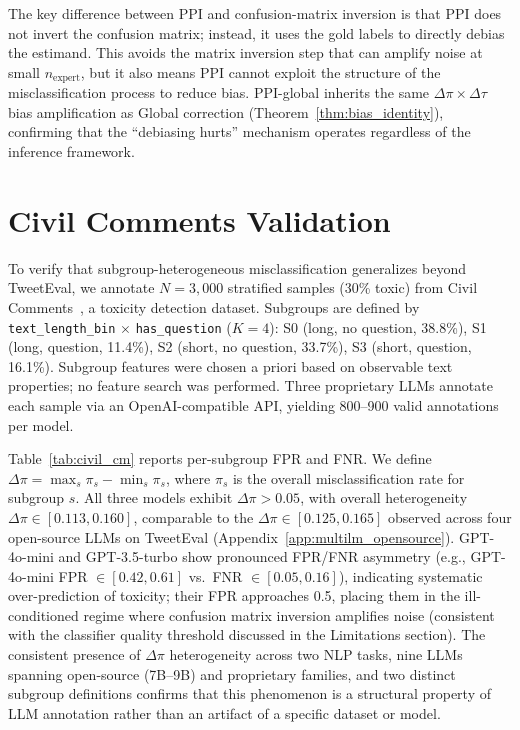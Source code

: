 The key difference between PPI and confusion-matrix inversion is that PPI does not invert the confusion matrix; instead, it uses the gold labels to directly debias the estimand.
This avoids the matrix inversion step that can amplify noise at small $n_{\text{expert}}$, but it also means PPI cannot exploit the structure of the misclassification process to reduce bias.
PPI-global inherits the same $\Delta\pi \times \Delta\tau$ bias amplification as Global correction (Theorem~\ref{thm:bias_identity}), confirming that the ``debiasing hurts'' mechanism operates regardless of the inference framework.

\section{Civil Comments Validation}
\label{app:civilcomments}

To verify that subgroup-heterogeneous misclassification generalizes beyond TweetEval, we annotate $N{=}3{,}000$ stratified samples (30\% toxic) from Civil Comments~\cite{borkan2019nuanced}, a toxicity detection dataset.
Subgroups are defined by \texttt{text\_length\_bin} $\times$ \texttt{has\_question} ($K{=}4$): S0 (long, no question, 38.8\%), S1 (long, question, 11.4\%), S2 (short, no question, 33.7\%), S3 (short, question, 16.1\%).
Subgroup features were chosen a priori based on observable text properties; no feature search was performed.
Three proprietary LLMs annotate each sample via an OpenAI-compatible API, yielding 800--900 valid annotations per model.

Table~\ref{tab:civil_cm} reports per-subgroup FPR and FNR.
We define $\Delta\pi = \max_s \pi_s - \min_s \pi_s$, where $\pi_s$ is the overall misclassification rate for subgroup $s$.
All three models exhibit $\Delta\pi > 0.05$, with overall heterogeneity $\Delta\pi \in [0.113, 0.160]$, comparable to the $\Delta\pi \in [0.125, 0.165]$ observed across four open-source LLMs on TweetEval (Appendix~\ref{app:multilm_opensource}).
GPT-4o-mini and GPT-3.5-turbo show pronounced FPR/FNR asymmetry (e.g., GPT-4o-mini FPR $\in [0.42, 0.61]$ vs.\ FNR $\in [0.05, 0.16]$), indicating systematic over-prediction of toxicity; their FPR approaches 0.5, placing them in the ill-conditioned regime where confusion matrix inversion amplifies noise (consistent with the classifier quality threshold discussed in the Limitations section).
The consistent presence of $\Delta\pi$ heterogeneity across two NLP tasks, nine LLMs spanning open-source (7B--9B) and proprietary families, and two distinct subgroup definitions confirms that this phenomenon is a structural property of LLM annotation rather than an artifact of a specific dataset or model.

